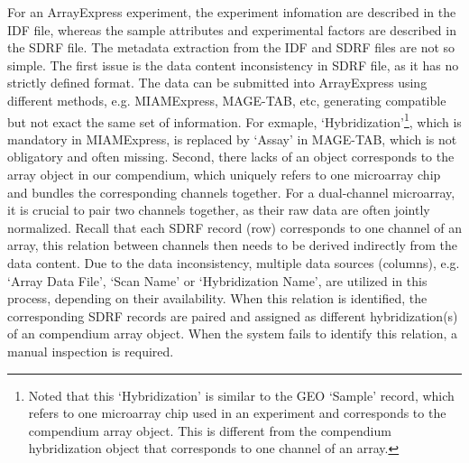 For an ArrayExpress experiment, the experiment infomation are described
in the IDF file, whereas the sample attributes and experimental factors
are described in the SDRF file.
%
The metadata extraction from the IDF and SDRF files are not so simple.
%
The first issue is the data content inconsistency in SDRF file, as it has
no strictly defined format.
%
The data can be submitted into ArrayExpress using different methods,
e.g. MIAMExpress, MAGE-TAB, etc, generating compatible but not exact the
same set of information.
%
For exmaple, `Hybridization'\footnote{Noted that this `Hybridization' is
  similar to the GEO `Sample' record, which refers to one microarray chip
  used in an experiment and corresponds to the compendium array object.
  This is different from the compendium hybridization object that
  corresponds to one channel of an array.}, which is mandatory in
MIAMExpress, is replaced by `Assay' in MAGE-TAB, which is not obligatory
and often missing.
%
%
Second, there lacks of an object corresponds to the array object in our
compendium, which uniquely refers to one microarray chip and bundles the
corresponding channels together.
%
For a dual-channel microarray, it is crucial to pair two channels
together, as their raw data are often jointly normalized.
%
Recall that each SDRF record (row) corresponds to one channel of an array,
this relation between channels then needs to be derived indirectly from the
data content.
%
Due to the data inconsistency, multiple data sources (columns), e.g. `Array
Data File', `Scan Name' or `Hybridization Name', are utilized in this process,
depending on their availability.
%
When this relation is identified, the corresponding SDRF records are
paired and assigned as different hybridization(s) of an compendium array
object.
%
When the system fails to identify this relation, a manual inspection is
required.


